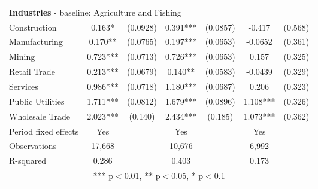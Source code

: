 \documentclass[12pt]{article}
\begin{document}
\begin{table}[H]
{\begin{tabular}{lcccccc}
    \multicolumn{7}{l}{\textbf{Industries} - baseline: Agriculture and Fishing} \\
    Construction & 0.163* & (0.0928) & 0.391*** & (0.0857) & -0.417 & (0.568) \\
    Manufacturing & 0.170** & (0.0765) & 0.197*** & (0.0653) & -0.0652 & (0.361) \\
    Mining & 0.723*** & (0.0713) & 0.726*** & (0.0653) & 0.157 & (0.325) \\
    Retail Trade & 0.213*** & (0.0679) & 0.140** & (0.0583) & -0.0439 & (0.329) \\
    Services & 0.986*** & (0.0718) & 1.180*** & (0.0687) & 0.206 & (0.323) \\
    Public Utilities & 1.711*** & (0.0812) & 1.679*** & (0.0896) & 1.108*** & (0.326) \\
    Wholesale Trade & 2.023*** & (0.140) & 2.434*** & (0.185) & 1.073*** & (0.362) \\

    \midrule
    Period fixed effects & Yes & & Yes & & Yes & \\
    Observations & 17,668 & & 10,676 & & 6,992 & \\
    R-squared & 0.286 & & 0.403 & & 0.173 & \\
    \bottomrule
    \multicolumn{7}{c}{*** p$<$0.01, ** p$<$0.05, * p$<$0.1} \\
    \end{tabular}%
    }
\end{table}
\end{document}
